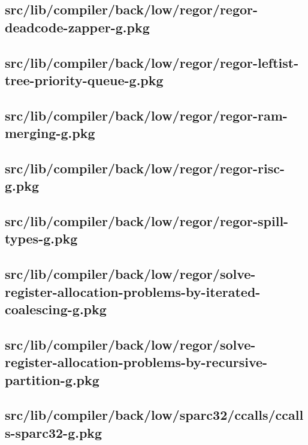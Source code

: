 \subsection{src/lib/compiler/back/low/regor/regor-deadcode-zapper-g.pkg}


\subsection{src/lib/compiler/back/low/regor/regor-leftist-tree-priority-queue-g.pkg}


\subsection{src/lib/compiler/back/low/regor/regor-ram-merging-g.pkg}


\subsection{src/lib/compiler/back/low/regor/regor-risc-g.pkg}


\subsection{src/lib/compiler/back/low/regor/regor-spill-types-g.pkg}


\subsection{src/lib/compiler/back/low/regor/solve-register-allocation-problems-by-iterated-coalescing-g.pkg}


\subsection{src/lib/compiler/back/low/regor/solve-register-allocation-problems-by-recursive-partition-g.pkg}


\subsection{src/lib/compiler/back/low/sparc32/ccalls/ccalls-sparc32-g.pkg}



